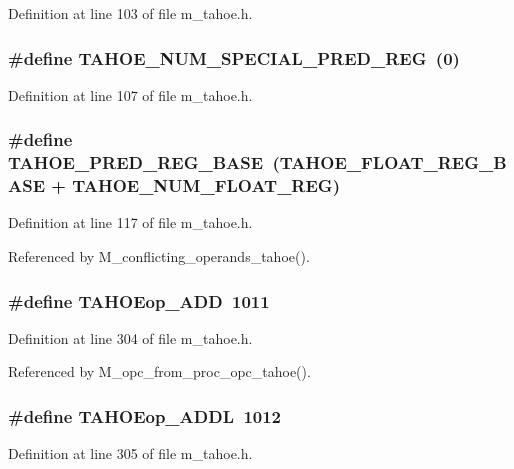 Definition at line 103 of file m\_\-tahoe.h.
\subsubsection{\setlength{\rightskip}{0pt plus 5cm}\#define TAHOE\_\-NUM\_\-SPECIAL\_\-PRED\_\-REG~(0)}\label{m__tahoe_8h_af42eb7de0dc1d98d809ee60a0de05c2}




Definition at line 107 of file m\_\-tahoe.h.
\subsubsection{\setlength{\rightskip}{0pt plus 5cm}\#define TAHOE\_\-PRED\_\-REG\_\-BASE~(TAHOE\_\-FLOAT\_\-REG\_\-BASE + TAHOE\_\-NUM\_\-FLOAT\_\-REG)}\label{m__tahoe_8h_184974bb88acecca3e651bb29183b256}




Definition at line 117 of file m\_\-tahoe.h.

Referenced by M\_\-conflicting\_\-operands\_\-tahoe().
\subsubsection{\setlength{\rightskip}{0pt plus 5cm}\#define TAHOEop\_\-ADD~1011}\label{m__tahoe_8h_c85da093cfb0eb0cd7406c2fa5499a66}




Definition at line 304 of file m\_\-tahoe.h.

Referenced by M\_\-opc\_\-from\_\-proc\_\-opc\_\-tahoe().
\subsubsection{\setlength{\rightskip}{0pt plus 5cm}\#define TAHOEop\_\-ADDL~1012}\label{m__tahoe_8h_b9eccdfbd09d7eccdb74b75cbfbfb822}




Definition at line 305 of file m\_\-tahoe.h.

